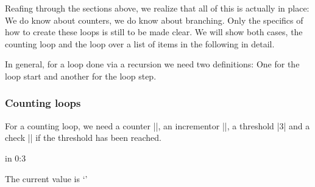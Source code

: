\documentclass[a4paper,doc2]{ltxdoc}
\begin{document}
Reafing through the sections above, we realize that all of this is actually in place: We do know about counters, we do know about branching. Only the specifics of how to create these loops is still to be made clear. We will show both cases, the counting loop and the loop over a list of items in the following in detail.

In general, for a loop done via a recursion we need two definitions: One for the loop start and another for the loop step.

\subsubsection{Counting loops}
\label{sec:counting:loops}
For a counting loop, we need a counter ||, an incrementor |\advance|, a threshold |3| and a check |\ifnum{}| if the threshold has been reached.


\begin{codeexample}[]
\long{}

\long{}
 in 0:{3}{%
	The current value is `\the{}'\par
}
\end{codeexample}
\end{document}
